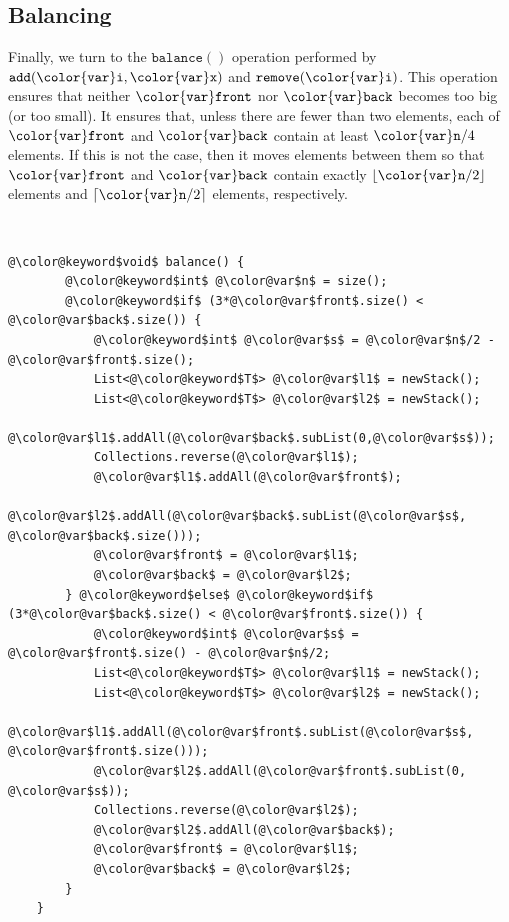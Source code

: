 \documentclass[10pt]{book}
\theoremstyle{plain}
\theoremstyle{definition}
\begin{document}
\subsection{Balancing}

Finally, we turn to the \ensuremath{\mathtt{balance()}} operation performed by \ensuremath{\mathtt{add({\color{var}i},{\color{var}x})}}
and \ensuremath{\mathtt{remove({\color{var}i})}}.  This operation ensures that neither \ensuremath{\mathtt{{\color{var}front}}} nor \ensuremath{\mathtt{{\color{var}back}}}
becomes too big (or too small).  It ensures that, unless there are fewer
than two elements, each of \ensuremath{\mathtt{{\color{var}front}}} and \ensuremath{\mathtt{{\color{var}back}}} contain at least $\ensuremath{\mathtt{{\color{var}n}}}/4$
elements. If this is not the case, then it moves elements between them
so that \ensuremath{\mathtt{{\color{var}front}}} and \ensuremath{\mathtt{{\color{var}back}}} contain exactly $\lfloor\ensuremath{\mathtt{{\color{var}n}}}/2\rfloor$ elements
and $\lceil\ensuremath{\mathtt{{\color{var}n}}}/2\rceil$ elements, respectively.



 \ \vspace{.5ex}\begin{Verbatim}[gobble=1,tabsize=2,frame=single,framerule=1.2pt,commandchars=\\@\$,label=\texttt{DualArrayDeque},labelposition=topline]
	@\color@keyword$void$ balance() {
		@\color@keyword$int$ @\color@var$n$ = size();
		@\color@keyword$if$ (3*@\color@var$front$.size() < @\color@var$back$.size()) {
			@\color@keyword$int$ @\color@var$s$ = @\color@var$n$/2 - @\color@var$front$.size();
			List<@\color@keyword$T$> @\color@var$l1$ = newStack();
			List<@\color@keyword$T$> @\color@var$l2$ = newStack();
			@\color@var$l1$.addAll(@\color@var$back$.subList(0,@\color@var$s$));
			Collections.reverse(@\color@var$l1$);
			@\color@var$l1$.addAll(@\color@var$front$);
			@\color@var$l2$.addAll(@\color@var$back$.subList(@\color@var$s$, @\color@var$back$.size()));
			@\color@var$front$ = @\color@var$l1$;
			@\color@var$back$ = @\color@var$l2$;
		} @\color@keyword$else$ @\color@keyword$if$ (3*@\color@var$back$.size() < @\color@var$front$.size()) {
			@\color@keyword$int$ @\color@var$s$ = @\color@var$front$.size() - @\color@var$n$/2;
			List<@\color@keyword$T$> @\color@var$l1$ = newStack();
			List<@\color@keyword$T$> @\color@var$l2$ = newStack();
			@\color@var$l1$.addAll(@\color@var$front$.subList(@\color@var$s$, @\color@var$front$.size()));
			@\color@var$l2$.addAll(@\color@var$front$.subList(0, @\color@var$s$));
			Collections.reverse(@\color@var$l2$);
			@\color@var$l2$.addAll(@\color@var$back$);
			@\color@var$front$ = @\color@var$l1$;
			@\color@var$back$ = @\color@var$l2$;
		}
	}
\end{Verbatim}
\end{document}
